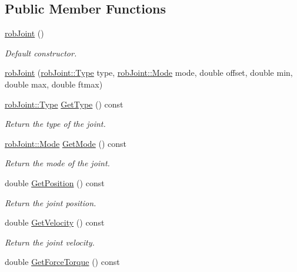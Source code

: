 \subsection*{Public Member Functions}
\begin{DoxyCompactItemize}
\item 
\hyperlink{classrob_joint_a62338efa956ba74c53fa5a8a8dd94a56}{rob\-Joint} ()
\begin{DoxyCompactList}\small\item\em Default constructor. \end{DoxyCompactList}\item 
\hyperlink{classrob_joint_a9ae7ed701bcaa0c0b5efa1e84f9409a9}{rob\-Joint} (\hyperlink{classrob_joint_a558d78a642cf2101aceddce0d82379b6}{rob\-Joint\-::\-Type} type, \hyperlink{classrob_joint_a7f77320bad87c259f71c18443f7bdd9c}{rob\-Joint\-::\-Mode} mode, double offset, double min, double max, double ftmax)
\item 
\hyperlink{classrob_joint_a558d78a642cf2101aceddce0d82379b6}{rob\-Joint\-::\-Type} \hyperlink{classrob_joint_a94377ddc42472101b84ab0f8c09ed889}{Get\-Type} () const 
\begin{DoxyCompactList}\small\item\em Return the type of the joint. \end{DoxyCompactList}\item 
\hyperlink{classrob_joint_a7f77320bad87c259f71c18443f7bdd9c}{rob\-Joint\-::\-Mode} \hyperlink{classrob_joint_aec5d8f6b85cc25adffad894bb2720474}{Get\-Mode} () const 
\begin{DoxyCompactList}\small\item\em Return the mode of the joint. \end{DoxyCompactList}\item 
double \hyperlink{classrob_joint_a13eefeaca37864ffe2e16273af28bd5d}{Get\-Position} () const 
\begin{DoxyCompactList}\small\item\em Return the joint position. \end{DoxyCompactList}\item 
double \hyperlink{classrob_joint_a1109748d5ebf7800922671978e54841a}{Get\-Velocity} () const 
\begin{DoxyCompactList}\small\item\em Return the joint velocity. \end{DoxyCompactList}\item 
double \hyperlink{classrob_joint_a8a92e06af4eb9b88d3027b8208472a32}{Get\-Force\-Torque} () const 

\end{DoxyCompactItemize}
